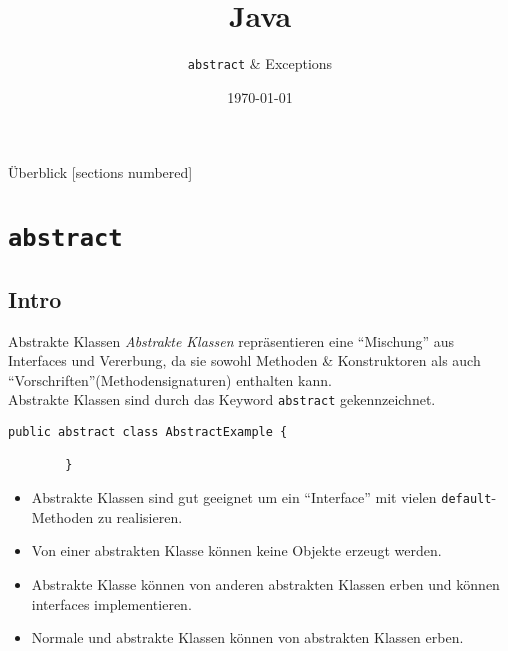 

\usepackage{csquotes}
\usepackage{qtree}

\title{Java}
\subtitle{\texttt{abstract} \& Exceptions}
\date{\today}



\begin{frame}
\titlepage
\end{frame}

\begin{frame}{Überblick}
    [sections numbered]
    \tableofcontents
\end{frame}

\section{\texttt{abstract}}
\subsection{Intro}
\begin{frame}[fragile]{Abstrakte Klassen}
    \textit{Abstrakte Klassen} repräsentieren eine \enquote{Mischung} aus Interfaces und Vererbung,
    da sie sowohl Methoden \& Konstruktoren als auch \enquote{Vorschriften}(Methodensignaturen) enthalten kann. \\
    Abstrakte Klassen sind durch das Keyword \texttt{abstract} gekennzeichnet.
    \begin{lstlisting}[gobble=8]
        public abstract class AbstractExample {

        }
    \end{lstlisting}
    \pause
    \begin{itemize}[<+->]
        \item Abstrakte Klassen sind gut geeignet um ein \enquote{Interface} mit vielen \texttt{default}-Methoden zu realisieren.
        \item Von einer abstrakten Klasse können keine Objekte erzeugt werden.
        \item Abstrakte Klasse können von anderen abstrakten Klassen erben und können interfaces implementieren.
        \item Normale und abstrakte Klassen können von abstrakten Klassen erben.
    \end{itemize}
\end{frame}


